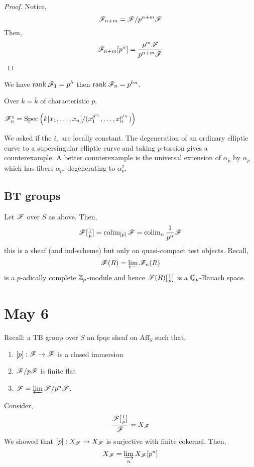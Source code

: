 \documentclass[12pt]{article}
\begin{document}
\begin{proof}
Notice,
\[ \mathscr{F}_{n+m} = \mathscr{F} / p^{n+m} \mathscr{F} \]
Then,
\[ \mathscr{F}_{n+m} [p^n] = \frac{p^m \mathscr{F}}{p^{n+m} \mathscr{F}} \]
\end{proof}

\begin{cor}
We have $\operatorname{\mathrm{rank}} \mathscr{F}_1 = p^h$ then $\operatorname{\mathrm{rank}} \mathscr{F}_n = p^{hn}$. 
\end{cor}

\begin{rmk}
Over $k = \bar{k}$ of characteristic $p$,
\begin{center}
\end{center}
\end{rmk}

\begin{theorem}[Raynaud]
$\mathscr{F}_n^\circ = \mathrm{Spec}\left( k[x_1, \dots, x_n]/(x_1^{p^{i_1}}, \dots, x_n^{p^{i_n}}) \right)$ 
\end{theorem}

\begin{rmk}
We asked if the $i_r$ are locally constant. The degeneration of an ordinary elliptic curve to a supersingular elliptic curve and taking $p$-torsion gives a counterexample. A better counterexample is the universal extension of $\alpha_p$ by $\alpha_p$ which has fibers $\alpha_{p^2}$ degenerating to $\alpha_p^2$. 
\end{rmk}

\subsection{BT groups}

Let $\mathscr{F}$ over $S$ as above. Then,
\[ \mathscr{F}[\tfrac{1}{p}] = \operatorname{\mathrm{colim}}_{[p]} \mathscr{F} = \operatorname{\mathrm{colim}}_n \frac{1}{p^n} \mathscr{F} \]
this is a sheaf (and ind-scheme) but only on quasi-compact test objects. Recall,
\[ \mathscr{F}(R) = \varprojlim \mathscr{F}_n(R) \]
is a $p$-adically complete $\mathbb{Z}_p$-module and hence $\mathscr{F}(R)[\tfrac{1}{p}]$ is a $\mathbb{Q}_p$-Banach space. 

\section{May 6}

Recall: a TB group over $S$ an fpqc sheaf on $\mathrm{Aff}_S$ such that,
\begin{enumerate}
\item $[p] : \mathscr{F} \to \mathscr{F}$ is a closed immersion
\item $\mathscr{F} / p \mathscr{F}$ is finite flat
\item $\mathscr{F} = \varprojlim \mathscr{F} / p^n \mathscr{F}$.
\end{enumerate}
Consider,
\[ \frac{\mathscr{F}[\frac{1}{p}]}{\mathscr{F}} = X_{\mathscr{F}} \]
We showed that $[p] : X_{\mathscr{F}} \to X_{\mathscr{F}}$ is surjective with finite cokernel. Then,
\[ X_{\mathscr{F}} = \varinjlim_{n} X_{\mathscr{F}}[p^n] \]
\end{document}
